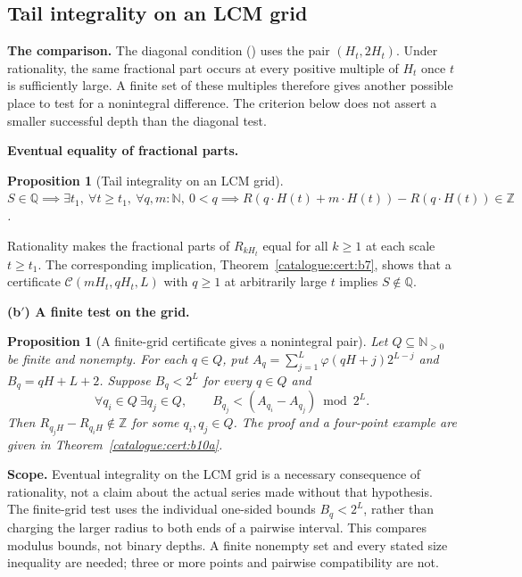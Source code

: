 \documentclass[11pt]{article}
\theoremstyle{plain}
\newtheorem{prop}[thm]{Proposition}
\theoremstyle{definition}
\theoremstyle{remark}
\newcommand{\lean}[2]{\leanlink{#2}}
\begin{document}
\subsection{Tail integrality on an LCM grid}

\textbf{The comparison.} The diagonal condition
(\lean{Erdos249257.TotientTailPeriodKiller.irrational_totient_series_iff_lcm_diagonal_certificate_supply}{LcmConeFlatness.lean:426})
uses the pair $(H_t,2H_t)$. Under rationality, the same fractional part
occurs at every positive multiple of $H_t$ once $t$ is sufficiently
large. A finite set of these multiples therefore gives another possible
place to test for a nonintegral difference. The criterion below does not
assert a smaller successful depth than the diagonal test.

\textbf{Eventual equality of fractional parts.}
\begin{prop}[Tail integrality on an LCM grid]\label{prop:tail-integrality-lcm-grid}
\(S\in\mathbb Q \implies \exists t_1,\ \forall t\ge t_1,\
\forall q,m:\mathbb N,\ 0<q \implies {R}(q\cdot
{H}(t)+m\cdot{H}(t)) -
{R}(q\cdot{H}(t)) \in
\mathbb Z\).
\end{prop}
Rationality makes the fractional parts of $R_{kH_t}$ equal for all
$k\ge1$ at each scale $t\ge t_1$. The corresponding implication,
Theorem~\ref{catalogue:cert:b7}, shows that a certificate $\mathcal C(mH_t,qH_t,L)$ with $q\ge1$
at arbitrarily large $t$ implies $S\notin\mathbb Q$.


\textbf{(b\('\)) A finite test on the grid.}
\begin{prop}[A finite-grid certificate gives a nonintegral pair]\label{prop:finite-grid-certificate-gives-nonintegral}
Let $Q\subseteq\mathbb N_{>0}$ be finite and nonempty. For each $q\in Q$,
put $A_q=\sum_{j=1}^{L}\varphi(qH+j)2^{L-j}$ and $B_q=qH+L+2$.
Suppose $B_q<2^L$ for every $q\in Q$ and
\[
 \forall q_i\in Q\ \exists q_j\in Q,\qquad
 B_{q_j}<(A_{q_i}-A_{q_j})\bmod2^L.
\]
Then $R_{q_jH}-R_{q_iH}\notin\mathbb Z$ for some $q_i,q_j\in Q$.
The proof and a four-point example are given in
Theorem~\ref{catalogue:cert:b10a}.
\end{prop}

\textbf{Scope.} Eventual integrality on the LCM grid is a necessary
consequence of rationality, not a claim about the actual series made
without that hypothesis. The finite-grid test uses the individual
one-sided bounds $B_q<2^L$, rather than charging the larger radius to
both ends of a pairwise interval. This compares modulus bounds, not
binary depths. A finite nonempty set and every stated size inequality
are needed; three or more points and pairwise compatibility are not.
\end{document}
